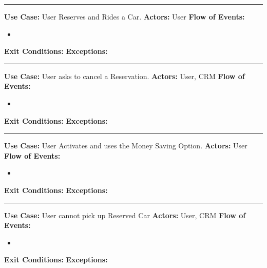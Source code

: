 \documentclass[a4paper]{article}
\begin{document}
\begin{center}
\rule{8cm}{0.4pt}
\end{center}
\textbf{Use Case:} User Reserves and Rides a Car.
\newline
\textbf{Actors:} User
\newline
\textbf{Flow of Events:}
\begin{itemize}
\item 
\end{itemize}
\textbf{Exit Conditions:}
\newline
\textbf{Exceptions:}
\newline

\begin{center}
\rule{8cm}{0.4pt}
\end{center}
\textbf{Use Case:} User asks to cancel a Reservation.
\newline
\textbf{Actors:} User, CRM
\newline
\textbf{Flow of Events:}
\begin{itemize}
\item 
\end{itemize}
\textbf{Exit Conditions:}
\newline
\textbf{Exceptions:}
\newline

\begin{center}
\rule{8cm}{0.4pt}
\end{center}
\textbf{Use Case:} User Activates and uses the Money Saving Option.
\newline
\textbf{Actors:} User
\newline
\textbf{Flow of Events:}
\begin{itemize}
\item 
\end{itemize}
\textbf{Exit Conditions:}
\newline
\textbf{Exceptions:}
\newline

\begin{center}
\rule{8cm}{0.4pt}
\end{center}
\textbf{Use Case:} User cannot pick up Reserved Car
\newline
\textbf{Actors:} User, CRM
\newline
\textbf{Flow of Events:}
\begin{itemize}
\item 
\end{itemize}
\textbf{Exit Conditions:}
\newline
\textbf{Exceptions:}
\newline
\end{document}
